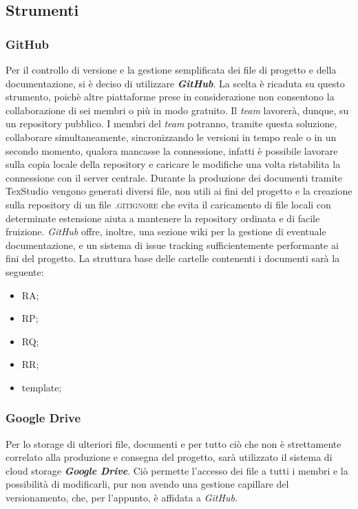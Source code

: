	\subsection{Strumenti}

		\subsubsection{GitHub}
		Per il controllo di versione e la gestione semplificata dei file di progetto e della documentazione, si è deciso di utilizzare \textbf{\textit{GitHub}}. La scelta è ricaduta su questo strumento, poichè altre piattaforme prese in considerazione non consentono la collaborazione di sei membri o più in modo gratuito. Il \textit{team} lavorerà, dunque, su un repository pubblico. I membri del \textit{team} potranno, tramite questa soluzione, collaborare simultaneamente, sincronizzando le versioni in tempo reale o in un secondo momento, qualora mancasse la connessione, infatti è possibile lavorare sulla copia locale della repository e caricare le modifiche una volta ristabilita la connessione con il server centrale. Durante la produzione dei documenti tramite TexStudio vengono generati diversi file, non utili ai fini del progetto e la creazione sulla repository di un file \textsc{.gitignore} che evita il caricamento di file locali con determinate estensione aiuta a mantenere la repository ordinata e di facile fruizione. \textit{GitHub} offre, inoltre, una sezione wiki per la gestione di eventuale documentazione, e un sistema di issue tracking sufficientemente performante ai fini del progetto. 
		La struttura base delle cartelle contenenti i documenti sarà la seguente:
		\begin{itemize}
			\item RA;
			\item RP;
			\item RQ;
			\item RR;
			\item template;
		\end{itemize}

		\subsubsection{Google Drive}
		Per lo storage di ulteriori file, documenti e per tutto ciò che non è strettamente correlato alla produzione e consegna del progetto, sarà utilizzato il sistema di cloud storage \textbf{\textit{Google Drive}}. Ciò permette l'accesso dei file a tutti i membri e la possibilità di modificarli, pur non avendo una gestione capillare del versionamento, che, per l'appunto, è affidata a \textit{GitHub}.

